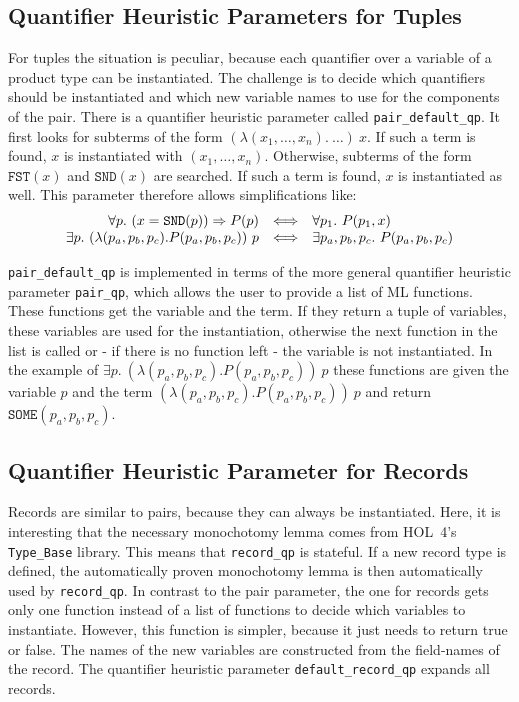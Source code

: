 \documentclass[a4paper,12pt,DIV=12,oneside]{scrbook}
\theoremstyle{definition}
\theoremstyle{remark}
\begin{document}
\subsection{Quantifier Heuristic Parameters for Tuples}

For tuples the situation is peculiar, because each quantifier over a variable of a product type
can be instantiated. The challenge is to decide which quantifiers should be instantiated and 
which new variable names to use for the components of the pair.
There is a quantifier heuristic parameter called \texttt{pair\_default\_qp}. It first looks for
subterms of the form $(\lambda (x_1, \ldots, x_n).\ \ldots)\ x$. If such a term is found, $x$ is instantiated with
$(x_1, \ldots, x_n)$. Otherwise, subterms of the form $\texttt{FST}(x)$ and $\texttt{SND}(x)$ are searched. If such a term
is found, $x$ is instantiated as well. This parameter therefore allows simplifications like:
%
\[\begin{array}{r@{\quad \Longleftrightarrow \quad}l}
\forall p.\ (x = \texttt{SND}(p)) \Rightarrow P(p)& \forall p_1.\ P(p_1, x) \\
\exists p.\ (\lambda (p_a, p_b, p_c). P(p_a, p_b, p_c))\ p & \exists p_a, p_b, p_c.\ P(p_a, p_b, p_c) 
\end{array}\]

\texttt{pair\_default\_qp} is implemented in terms of the more general
quantifier heuristic parameter \texttt{pair\_qp}, which allows the
user to provide a list of ML functions. These functions get the
variable and the term. If they return a tuple of variables, these
variables are used for the instantiation, otherwise the next function
in the list is called or - if there is no function left - the variable
is not instantiated. In the example of $\exists p.\ (\lambda (p_a,
p_b, p_c). P(p_a, p_b, p_c))\ p$ these functions are given the
variable $p$ and the term $(\lambda (p_a, p_b, p_c). P(p_a, p_b,
p_c))\ p$ and return $\texttt{SOME} (p_a, p_b, p_c)$. 

\subsection{Quantifier Heuristic Parameter for Records}

Records are similar to pairs, because they can always be instantiated. Here, it is interesting that the necessary
monochotomy lemma comes from HOL~4's \texttt{Type\_Base} library. This means that \texttt{record\_qp} is stateful.
If a new record type is defined, the automatically proven monochotomy lemma is then automatically used
by \texttt{record\_qp}. In contrast to the pair parameter, the one for records gets only one function instead of a
list of functions to decide which variables to instantiate. However, this function is simpler, because it just needs
to return true or false. The names of the new variables are constructed from the field-names of the record.
The quantifier heuristic parameter \texttt{default\_record\_qp} expands all records.
\end{document}
